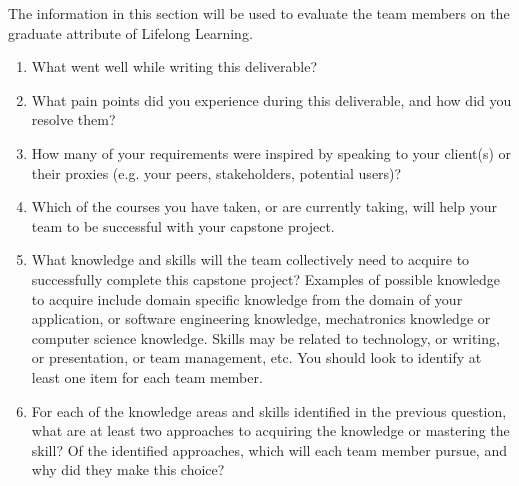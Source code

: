 \documentclass[12pt]{article}
\begin{document}

The information in this section will be used to evaluate the team members on the
graduate attribute of Lifelong Learning.  



\begin{enumerate}
  \item What went well while writing this deliverable? 
  \item What pain points did you experience during this deliverable, and how did
  you resolve them?
  \item How many of your requirements were inspired by speaking to your
  client(s) or their proxies (e.g. your peers, stakeholders, potential users)?
  \item Which of the courses you have taken, or are currently taking, will help
  your team to be successful with your capstone project.
  \item What knowledge and skills will the team collectively need to acquire to
  successfully complete this capstone project?  Examples of possible knowledge
  to acquire include domain specific knowledge from the domain of your
  application, or software engineering knowledge, mechatronics knowledge or
  computer science knowledge.  Skills may be related to technology, or writing,
  or presentation, or team management, etc.  You should look to identify at
  least one item for each team member.
  \item For each of the knowledge areas and skills identified in the previous
  question, what are at least two approaches to acquiring the knowledge or
  mastering the skill?  Of the identified approaches, which will each team
  member pursue, and why did they make this choice?
\end{enumerate}
\end{document}
